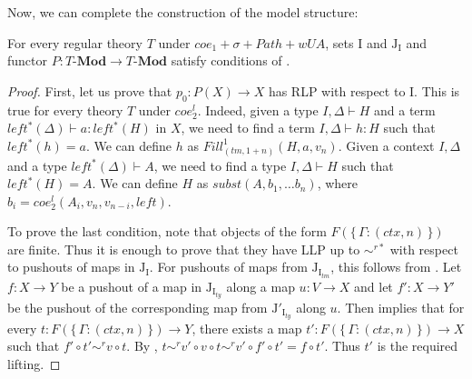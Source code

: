 \documentclass[reqno]{amsart}
\theoremstyle{definition}
\theoremstyle{remark}
\newcommand{\cat}[1]{\mathbf{#1}}
\newcommand{\Mod}[1]{#1\text{-}\cat{Mod}}
\newcommand{\I}{\mathrm{I}}
\newcommand{\J}{\mathrm{J}}
\numberwithin{figure}{section}
\begin{document}
Now, we can complete the construction of the model structure:
\begin{thm}
For every regular theory $T$ under $coe_1 + \sigma + Path + wUA$, sets $\I$ and $\J_\I$ and functor $P : \Mod{T} \to \Mod{T}$ satisfy conditions of .
\end{thm}
\begin{proof}
First, let us prove that $p_0 : P(X) \to X$ has RLP with respect to $\I$.
This is true for every theory $T$ under $coe^l_2$.
Indeed, given a type $I, \Delta \vdash H$ and a term $left^*(\Delta) \vdash a : left^*(H)$ in $X$,
we need to find a term $I, \Delta \vdash h : H$ such that $left^*(h) = a$.
We can define $h$ as $Fill^1_{(tm,1+n)}(H, a, v_n)$.
Given a context $I, \Delta$ and a type $left^*(\Delta) \vdash A$,
we need to find a type $I, \Delta \vdash H$ such that $left^*(H) = A$.
We can define $H$ as $subst(A, b_1, \ldots b_n)$, where $b_i = coe^l_2(A_i, v_n, v_{n-i}, left)$.

To prove the last condition, note that objects of the form $F(\{\,\Gamma : (ctx,n)\,\})$ are finite.
Thus it is enough to prove that they have LLP up to $\sim^{r*}$ with respect to pushouts of maps in $\J_\I$.
For pushouts of maps from $\J_{\I_{tm}}$, this follows from .
Let $f : X \to Y$ be a pushout of a map in $\J_{\I_{ty}}$ along a map $u : V \to X$ and let $f' : X \to Y'$ be the pushout of the corresponding map from $\J'_{\I_{ty}}$ along $u$.
Then  implies that for every $t : F(\{\,\Gamma : (ctx,n)\,\}) \to Y$, there exists a map $t' : F(\{\,\Gamma : (ctx,n)\,\}) \to X$ such that $f' \circ t' \sim^r v \circ t$.
By , $t \sim^r v' \circ v \circ t \sim^r v' \circ f' \circ t' = f \circ t'$.
Thus $t'$ is the required lifting.
\end{proof}



\end{document}
